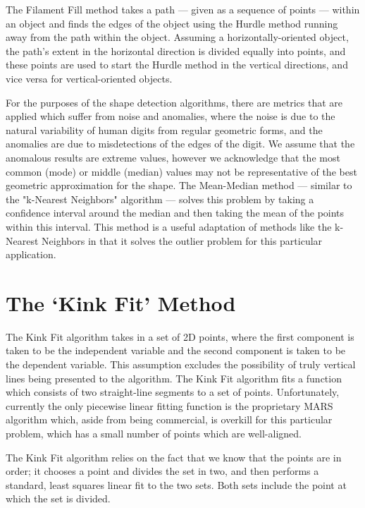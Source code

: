 The Filament Fill method takes a path --- given as a sequence of points --- within an object and finds the edges of the object using the Hurdle method running away from the path within the object. Assuming a horizontally-oriented object, the path's extent in the horizontal direction is divided equally into points, and these points are used to start the Hurdle method in the vertical directions, and vice versa for vertical-oriented objects.



For the purposes of the shape detection algorithms, there are metrics that are applied which suffer from noise and anomalies, where the noise is due to the natural variability of human digits from regular geometric forms, and the anomalies are due to misdetections of the edges of the digit. We assume that the anomalous results are extreme values, however we acknowledge that the most common (mode) or middle (median) values may not be representative of the best geometric approximation for the shape. The Mean-Median method --- similar to the "k-Nearest Neighbors" algorithm --- solves this problem by taking a confidence interval around the median and then taking the mean of the points within this interval. This method is a useful adaptation of methods like the k-Nearest Neighbors in that it solves the outlier problem for this particular application.

\section{The `Kink Fit' Method}\label{sec:KinkFitMethod}
The Kink Fit algorithm takes in a set of 2D points, where the first component is taken to be the independent variable and the second component is taken to be the dependent variable. This assumption excludes the possibility of truly vertical lines being presented to the algorithm. The Kink Fit algorithm fits a function which consists of two straight-line segments to a set of points. Unfortunately, currently the only piecewise linear fitting function is the proprietary MARS algorithm which, aside from being commercial, is overkill for this particular problem, which has a small number of points which are well-aligned. 

The Kink Fit algorithm relies on the fact that we know that the points are in order; it chooses a point and divides the set in two, and then performs a standard, least squares linear fit to the two sets. Both sets include the point at which the set is divided. 

